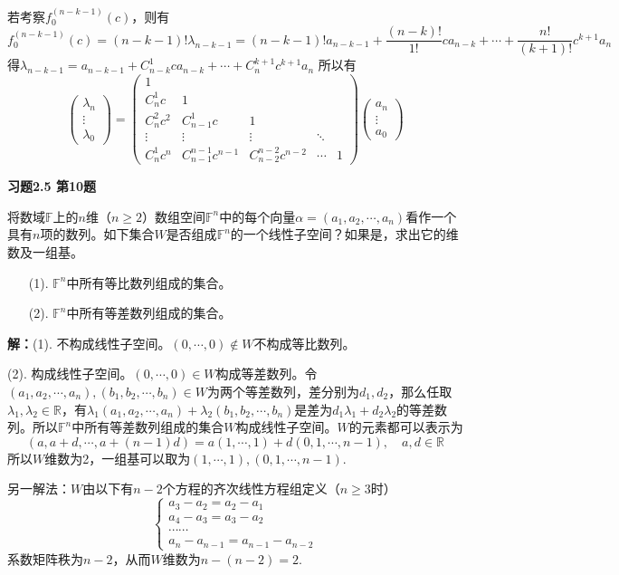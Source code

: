 若考察$f_0^{(n-k-1)}(c)$，则有
$$
f_0^{(n-k-1)}(c) = (n-k-1)!\lambda_{n-k-1} = (n-k-1)!a_{n-k-1} + \dfrac{(n-k)!}{1!} c a_{n-k} + \cdots + \dfrac{n!}{(k+1)!} c^{k+1} a_{n}
$$
得$\lambda_{n-k-1} = a_{n-k-1} + C_{n-k}^1c a_{n-k} + \cdots + C_{n}^{k+1}c^{k+1} a_{n}$
所以有
$$
\begin{pmatrix} \lambda_n \\ \vdots \\ \lambda_0 \end{pmatrix}
= \begin{pmatrix} 1 & & & & \\ C_{n}^1c & 1 & & & \\ C_{n}^2c^2 & C_{n-1}^1c & 1 & & \\ \vdots & \vdots & \vdots & \ddots & \\ C_{n}^1c^n & C_{n-1}^{n-1}c^{n-1} & C_{n-2}^{n-2}c^{n-2} & \cdots & 1 \end{pmatrix}
\begin{pmatrix} a_n \\ \vdots \\ a_0 \end{pmatrix}
$$

\newpageorvspace

{\bf 习题2.5 第10题}

将数域$\mathbb{F}$上的$n$维（$n\geqslant 2$）数组空间$\mathbb{F}^n$中的每个向量$\alpha = (a_1,a_2,\cdots,a_n)$看作一个具有$n$项的数列。如下集合$W$是否组成$\mathbb{F}^n$的一个线性子空间？如果是，求出它的维数及一组基。
\begin{itemize}
\item[(1).] $\mathbb{F}^n$中所有等比数列组成的集合。
\item[(2).] $\mathbb{F}^n$中所有等差数列组成的集合。
\end{itemize}

{\bf 解：}(1). 不构成线性子空间。$(0,\cdots,0)\not\in W$不构成等比数列。

(2). 构成线性子空间。$(0,\cdots,0)\in W$构成等差数列。令$(a_1,a_2,\cdots,a_n), (b_1,b_2,\cdots,b_n)\in W$为两个等差数列，差分别为$d_1, d_2$，那么任取$\lambda_1, \lambda_2 \in \mathbb{R}$，有$\lambda_1(a_1,a_2,\cdots,a_n) + \lambda_2(b_1,b_2,\cdots,b_n)$是差为$d_1\lambda_1 + d_2\lambda_2$的等差数列。所以$\mathbb{F}^n$中所有等差数列组成的集合$W$构成线性子空间。$W$的元素都可以表示为
$$(a,a+d,\cdots,a+(n-1)d) = a(1,\cdots,1) + d(0,1,\cdots,n-1), \quad a,d\in\mathbb{R}$$
所以$W$维数为2，一组基可以取为$(1,\cdots,1), (0,1,\cdots,n-1)$.

另一解法：$W$由以下有$n-2$个方程的齐次线性方程组定义（$n\geqslant 3$时）
$$\begin{cases}
a_3-a_2 = a_2-a_1 \\
a_4-a_3 = a_3-a_2 \\
\cdots\cdots \\
a_n-a_{n-1} = a_{n-1}-a_{n-2}
\end{cases}$$
系数矩阵秩为$n-2$，从而$W$维数为$n-(n-2)=2$.

